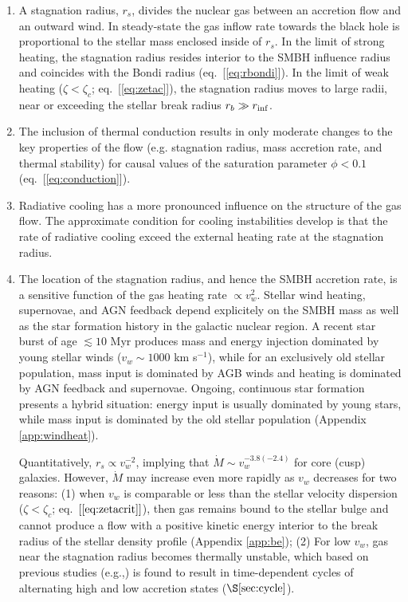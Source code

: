 \documentclass[usenatbib,fleqn]{mn2e}
\newcommand{\Mdot}{\dot{M}}
\newcommand{\rs}{r_s}
\begin{document}
  \begin{enumerate}
  \item A stagnation radius, $\rs$, divides the nuclear gas between an accretion flow and an
    outward wind. In steady-state the gas inflow rate towards the black hole is proportional to the
    stellar mass enclosed inside of $\rs$.  In the limit of strong heating, the stagnation radius resides interior to the SMBH influence radius and coincides with the Bondi radius (eq.~[\ref{eq:rbondi}]).  In the limit of weak heating ($\zeta < \zeta_c$; eq.~[\ref{eq:zetac}]), the stagnation radius moves to large radii, near or exceeding the stellar break radius $r_b \gg r_{\rm inf}$.  

\item The inclusion of thermal conduction results in only moderate changes to the key properties of the flow (e.g. stagnation radius, mass accretion rate, and thermal stability) for causal values of the saturation parameter $\phi < 0.1$ (eq.~[\ref{eq:conduction}]).  

\item Radiative cooling has a more pronounced influence on the structure of the gas flow.  The approximate condition for cooling instabilities develop is that the rate of radiative cooling exceed the external heating rate at the stagnation radius.  

  \item The location of the stagnation radius, and hence the SMBH accretion rate, is a sensitive function of the gas heating rate $\propto v_w^{2}$.  Stellar wind heating, supernovae, and AGN feedback depend explicitely on the SMBH mass as well as the star formation history in the galactic nuclear region.  A recent star burst of age $\lesssim 10$ Myr produces mass and energy injection dominated by young stellar winds ($v_w \sim 1000$ km s$^{-1}$), while for an exclusively old stellar population, mass input is dominated by AGB winds and heating is dominated by AGN feedback and supernovae.  Ongoing, continuous star formation presents a hybrid situation: energy input is usually dominated by young stars, while mass input is dominated by the old stellar population (Appendix \ref{app:windheat}).  
  
Quantitatively, $\rs\propto v_w^{-2}$, implying that $\Mdot\sim v_w^{-3.8 (-2.4)}$ for core (cusp) galaxies.  However, $\Mdot$ may increase even more rapidly as $v_w$ decreases for two reasons: (1) when $v_w$ is comparable or less than the stellar velocity dispersion ($\zeta < \zeta_c$; eq.~$[\ref{eq:zetacrit}]$), then gas remains bound to the stellar bulge and cannot produce a flow with a positive kinetic energy interior to the break radius of the stellar density profile (Appendix \ref{app:be}); (2) For low $v_w$, gas near the stagnation radius becomes thermally unstable, which based on previous studies (e.g.,\citealt{Ciotti+10}) is found to result in time-dependent cycles of alternating high and low accretion states ($\S\ref{sec:cycle}$).


\end{enumerate}
\end{document}

